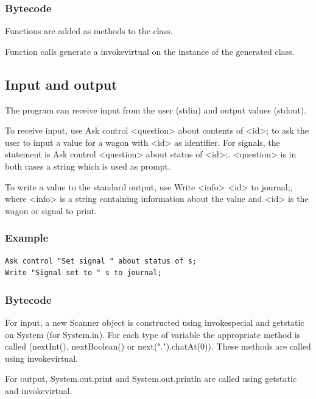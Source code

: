 \documentclass[10pt,a4paper]{article}
\newcommand{\code}[1]{{\ttfamily\small #1}}
\begin{document}
\subsubsection*{Bytecode}

Functions are added as methods to the class.

Function calls generate a \code{invokevirtual} on the instance of the generated class.

\subsection{Input and output}

The program can receive input from the user (stdin) and output values (stdout).

To receive input, use \code{Ask control <question> about contents of <id>;} to ask the user to input a value for a wagon with \code{<id>} as identifier. For signals, the statement is \code{Ask control <question> about status of <id>;}. \code{<question>} is in both cases a string which is used as prompt.

To write a value to the standard output, use \code{Write <info> <id> to journal;}, where \code{<info>} is a string containing information about the value and \code{<id>} is the wagon or signal to print.

\subsubsection*{Example}

\begin{lstlisting}
Ask control "Set signal " about status of s;
Write "Signal set to " s to journal;
\end{lstlisting}

\subsubsection*{Bytecode}

For input, a new \code{Scanner} object is constructed using \code{invokespecial} and \code{getstatic} on \code{System} (for \code{System.in}). For each type of variable the appropriate method is called (\code{nextInt()}, \code{nextBoolean()} or \code{next(".").chatAt(0)}). These methods are called using \code{invokevirtual}.

For output, \code{System.out.print} and \code{System.out.println} are called using \code{getstatic} and \code{invokevirtual}.
\end{document}
